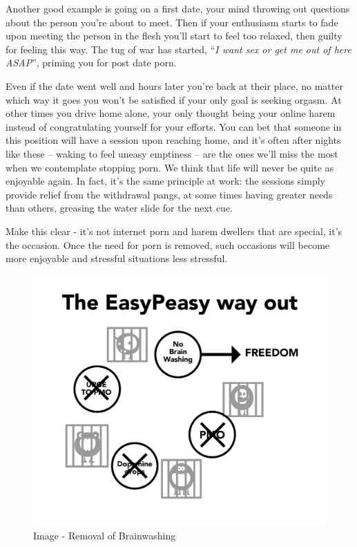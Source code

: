 \documentclass[
]{book}
\begin{document}
Another good example is going on a first date, your mind throwing out questions about the person you're about to meet. Then if your enthusiasm starts to fade upon meeting the person in the flesh you'll start to feel too relaxed, then guilty for feeling this way. The tug of war has started, ``\emph{I want sex or get me out of here ASAP}'', priming you for post date porn.

Even if the date went well and hours later you're back at their place, no matter which way it goes you won't be satisfied if your only goal is seeking orgasm. At other times you drive home alone, your only thought being your online harem instead of congratulating yourself for your efforts. You can bet that someone in this position will have a session upon reaching home, and it's often after nights like these -- waking to feel uneasy emptiness -- are the ones we'll miss the most when we contemplate stopping porn. We think that life will never be quite as enjoyable again. In fact, it's the same principle at work: the sessions simply provide relief from the withdrawal pangs, at some times having greater needs than others, greasing the water slide for the next cue.

Make this clear - it's not internet porn and harem dwellers that are special, it's the occasion. Once the need for porn is removed, such occasions will become more enjoyable and stressful situations less stressful.

\begin{figure}
\centering
\includegraphics{images/trap-resolved.png}
\caption{Image - Removal of Brainwashing}
\end{figure}
\end{document}
